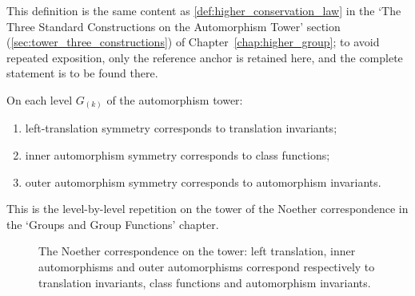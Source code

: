 \begin{definition}\label{def:higher_conservation_law_2}
This definition is the same content as \cref{def:higher_conservation_law} in the `The Three Standard Constructions on the Automorphism Tower' section (\cref{sec:tower_three_constructions}) of Chapter~\ref{chap:higher_group}; to avoid repeated exposition, only the reference anchor is retained here, and the complete statement is to be found there.
\end{definition}

\begin{remark}\label{thm:higher_noether}
On each level $G_{(k)}$ of the automorphism tower:
\begin{enumerate}[label=(\roman*)]
    \item left-translation symmetry corresponds to translation invariants;
    \item inner automorphism symmetry corresponds to class functions;
    \item outer automorphism symmetry corresponds to automorphism invariants.
\end{enumerate}
This is the level-by-level repetition on the tower of the Noether correspondence in the `Groups and Group Functions' chapter.
\end{remark}

\begin{figure}[htbp]
\centering
{}
\caption{The Noether correspondence on the tower: left translation, inner automorphisms and outer automorphisms correspond respectively to translation invariants, class functions and automorphism invariants.}
\label{fig:higher_noether}
\end{figure}

